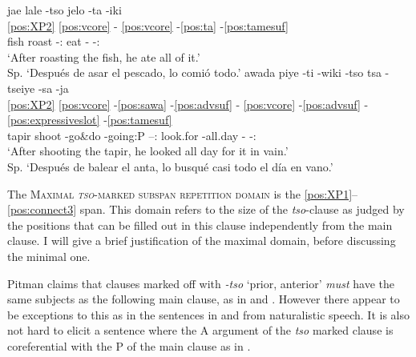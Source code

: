 \documentclass[output=paper,hidelinks]{langscibook}
\begin{document}
\ea 
 \ea\label{ex:tso...jelo}
    \glll jae lale -tso jelo -ta -iki \\
    \ref{pos:XP2} \ref{pos:vcore} -  \ref{pos:vcore} -\ref{pos:ta} -\ref{pos:tamesuf} \\
    fish roast -\Prior{}:\Compl{} eat -\Third\Aarg{} -\Recp{}:\Pst{} \\
    \glt `After roasting the fish, he ate all of it.' \\ Sp. `Después de asar el pescado, lo comió todo.'  \hfill \citep[102]{pitman:1980:araonasketch}
 \ex \label{ex:tso...tsa}
    \glll awada piye -ti -wiki -tso tsa -tseiye -sa -ja \\
    \ref{pos:XP2} \ref{pos:vcore} -\ref{pos:sawa} -\ref{pos:advsuf} - \ref{pos:vcore} -\ref{pos:advsuf} -\ref{pos:expressiveslot} -\ref{pos:tamesuf}   \\
    tapir shoot -go\&do -going:P --\Prior{}:\Compl{} look.for -all.day -\Frust{}   -\Recp{}:\Pst{} \\
    \glt `After shooting the tapir, he looked all day for it in vain.' \\ Sp. `Después de balear el anta, lo busqué casi todo el día en vano.'  \hfill \citep[52]{pitman:1980:araonasketch}
 \z
\z 

The \textsc{Maximal \textit{tso}-marked subspan repetition domain} is the \ref{pos:XP1}--\ref{pos:connect3} span. This domain refers to the size of the \textit{tso}-clause as judged by the positions that can be filled out in this clause independently from the main clause. I will give a brief justification of the maximal domain, before discussing the minimal one.

\largerpage
Pitman claims that clauses marked off with \textit{-tso} `prior, anterior'  \textit{must} have the same subjects \citep{pitman:1980:araonasketch} as the following main clause, as in  and . However there appear to be exceptions to this as in the sentences in  and  from naturalistic speech. It is also not hard to elicit a sentence where the A argument of the \textit{tso} marked clause is coreferential with the P of the main clause as in .
\end{document}
